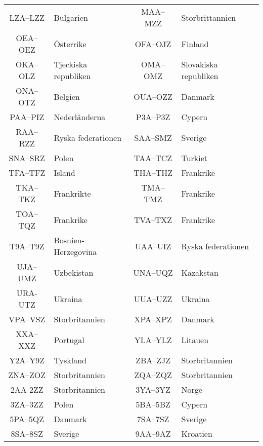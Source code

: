 \begin{center}
\begin{longtable}{cl|cl}
	      LZA--LZZ        & Bulgarien            &    MAA--MZZ     & Storbrittannien       \\
	      OEA--OEZ        & Österrike            &    OFA--OJZ     & Finland               \\
	      OKA--OLZ        & Tjeckiska republiken &    OMA--OMZ     & Slovakiska republiken \\
	      ONA--OTZ        & Belgien              &    OUA--OZZ     & Danmark               \\
	      PAA--PIZ        & Nederländerna        &    P3A--P3Z     & Cypern                \\
	      RAA--RZZ        & Ryska federationen   &    SAA--SMZ     & Sverige               \\
	      SNA--SRZ        & Polen                &    TAA--TCZ     & Turkiet               \\
	      TFA--TFZ        & Island               &    THA--THZ     & Frankrike             \\
	      TKA--TKZ        & Frankrikte           &    TMA--TMZ     & Frankrike             \\
	      TOA--TQZ        & Frankrike            &    TVA--TXZ     & Frankrike             \\
	      T9A--T9Z        & Bosnien-Herzegovina  &    UAA--UIZ     & Ryska federationen    \\
	      UJA--UMZ        & Uzbekistan           &    UNA--UQZ     & Kazakstan             \\
	       URA-UTZ        & Ukraina              &    UUA--UZZ     & Ukraina               \\
	      VPA--VSZ        & Storbritannien       &    XPA--XPZ     & Danmark               \\
	      XXA--XXZ        & Portugal             &    YLA--YLZ     & Litauen               \\
	      Y2A--Y9Z        & Tyskland             &    ZBA--ZJZ     & Storbritannien        \\
	      ZNA--ZOZ        & Storbritannien       &    ZQA--ZQZ     & Storbritannien        \\
	       2AA-2ZZ        & Storbritannien       &    3YA--3YZ     & Norge                 \\
	      3ZA--3ZZ        & Polen                &    5BA--5BZ     & Cypern                \\
	      5PA--5QZ        & Danmark              &    7SA--7SZ     & Sverige               \\
	      8SA--8SZ        & Sverige              &    9AA--9AZ     & Kroatien
\end{longtable}
\end{center}

